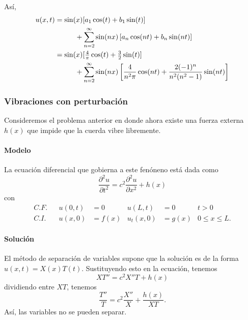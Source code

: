 \documentclass[11pt,letterpaper]{report}
\newcommand\<{\langle}
\renewcommand\>{\rangle}
\begin{document}
Así,
\begin{align*}
  u(x,t)
  &= \sin(x)[a_1\cos(t)+b_1\sin(t)]
  \\ &\hspace{10mm}
  + \sum_{n=2}^{\infty}\sin(nx)
    \left[
      a_n\cos(nt)+b_n\sin(nt)
    \right] \\
  &= \sin(x)[\tfrac{4}{\pi}\cos(t)+\tfrac{3}{2}\sin(t)]
  \\ &\hspace{10mm}
  + \sum_{n=2}^{\infty}\sin(nx)
    \left[
      \frac{4}{n^2\pi}\cos(nt)+\frac{2(-1)^n}{n^2(n^2-1)}\sin(nt)
    \right] \\
\end{align*}

\subsubsection{Vibraciones con perturbación}
Consideremos el problema anterior en donde ahora existe una fuerza
externa $h(x)$ que impide que la cuerda vibre libremente.

\paragraph{Modelo}
La ecuación diferencial que gobierna a este fenóneno está dada como
\[
  \frac{\partial ^2u}{\partial t^2}
  = c^2 \frac{\partial ^2u}{\partial x^2} + h(x)
\]
con
\begin{align*}
  C.F.&& u(0,t)&=0 & u(L,t)&=0 & t>0 \\
  C.I.&& u(x,0)&=f(x) & u_t(x,0)&=g(x) & 0\leq x\leq L.
\end{align*}

\paragraph{Solución}
El método de separación de variables supone que la solución es de la
forma $u(x,t)=X(x)T(t)$. Sustituyendo esto en la ecuación, tenemos
\[
  XT''=c^2X''T+h(x)
\]
dividiendo entre $XT$, tenemos
\[
  \frac{T''}{T} = c^2 \frac{X''}{X} + \frac{h(x)}{XT}
.\]
Así, las variables no se pueden separar.
\end{document}
